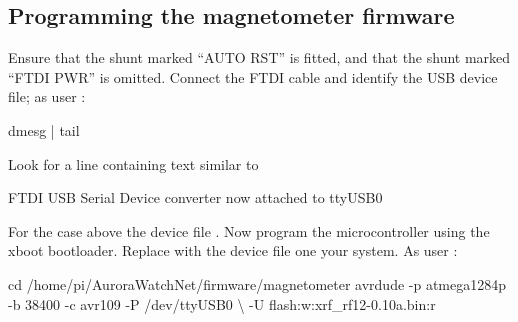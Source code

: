 \subsection{Programming the magnetometer firmware}
Ensure that the shunt marked ``AUTO RST'' is fitted, and that the
shunt marked ``FTDI PWR'' is omitted. Connect the FTDI cable and
identify the USB device file; as user \piUser:
\begin{Cmd}
  dmesg | tail
\end{Cmd}

Look for a line containing text similar to
\begin{Cmd}
  FTDI USB Serial Device converter now attached to ttyUSB0
\end{Cmd}
For the case above the device file . Now
program the microcontroller using the xboot bootloader. Replace
 with the device file one your system. As user
\piUser:
\begin{Cmd}
  cd /home/pi/AuroraWatchNet/firmware/magnetometer
  avrdude -p atmega1284p -b 38400 -c avr109 -P /dev/ttyUSB0 \textbackslash
      -U flash:w:xrf_rf12-0.10a.bin:r
\end{Cmd}



